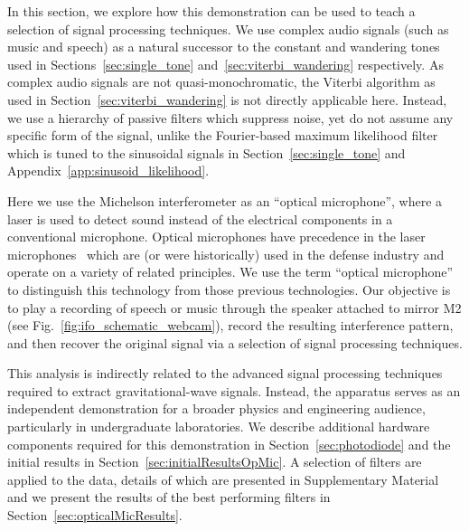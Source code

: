 \documentclass[paper-main.tex]{subfiles}
\begin{document}
In this section, we explore how this demonstration can be used to teach a selection of signal processing techniques. 
We use complex audio signals (such as music and speech) as a natural successor to the constant and wandering tones used in Sections~\ref{sec:single_tone} and~\ref{sec:viterbi_wandering} respectively.
As complex audio signals are not quasi-monochromatic, the Viterbi algorithm as used in Section~\ref{sec:viterbi_wandering} is not directly applicable here. 
Instead, we use a hierarchy of passive filters which suppress noise, yet do not assume any specific form of the signal, unlike the Fourier-based maximum likelihood filter which is tuned to the sinusoidal signals in Section~\ref{sec:single_tone} and Appendix~\ref{app:sinusoid_likelihood}.

Here we use the Michelson interferometer as an ``optical microphone'', where a laser is used to detect sound instead of the electrical components in a conventional microphone.
Optical microphones have precedence in the laser microphones~\cite{laser_microphone} which are (or were historically) used in the defense industry and operate on a variety of related principles. We use the term ``optical microphone'' to distinguish this technology from those previous technologies.
Our objective is to play a recording of speech or music through the speaker attached to mirror M2 (see Fig.~\ref{fig:ifo_schematic_webcam}), record the resulting interference pattern, and then recover the original signal via a selection of signal processing techniques. 


This analysis is indirectly related to the advanced signal processing techniques required to extract gravitational-wave signals. 
Instead, the apparatus serves as an independent demonstration for a broader physics and engineering audience, particularly in undergraduate laboratories. 
We describe additional hardware components required for this demonstration in Section~\ref{sec:photodiode} and the initial results in Section~\ref{sec:initialResultsOpMic}. 
A selection of filters are applied to the data, details of which are presented in Supplementary Material and we present the results of the best performing filters in Section~\ref{sec:opticalMicResults}. 
\end{document}
